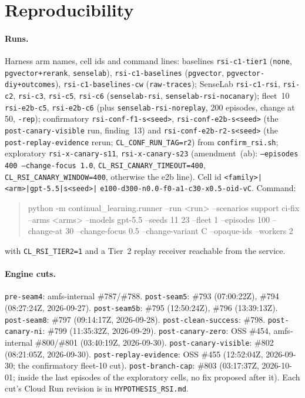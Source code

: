 \documentclass[11pt]{article}
\newcommand{\code}[1]{\texttt{#1}}
\begin{document}
\appendix
\section{Reproducibility}

\paragraph{Runs.} Harness arm names, cell ids and command lines: baselines
\code{rsi-c1-tier1} (\code{none}, \code{pgvector+rerank}, \code{senselab}),
\code{rsi-c1-baselines} (\code{pgvector}, \code{pgvector-diy+outcomes}),
\code{rsi-c1-baselines-cw} (\code{raw-traces}); SenseLab \code{rsi-c1-rsi}, \code{rsi-c2},
\code{rsi-c3}, \code{rsi-c5}, \code{rsi-c6} (\code{senselab-rsi},
\code{senselab-rsi-nocanary}); fleet~10 \code{rsi-e2b-c5}, \code{rsi-e2b-c6} (plus
\code{senselab-rsi-noreplay}, 200 episodes, change at 50, \code{-rep}); confirmatory
\code{rsi-conf-f1-s<seed>}, \code{rsi-conf-e2b-s<seed>} (the \code{post-canary-visible} run,
finding~13) and \code{rsi-conf-e2b-r2-s<seed>} (the \code{post-replay-evidence} rerun;
\code{CL\_CONF\_RUN\_TAG=r2}) from \code{confirm\_rsi.sh}; exploratory \code{rsi-x-canary-s11},
\code{rsi-x-canary-s23} (amendment~(ab): \code{--episodes 400 --change-focus 1.0},
\code{CL\_RSI\_CANARY\_TIMEOUT=400}, \code{CL\_RSI\_CANARY\_WINDOW=400}, otherwise the e2b
line). Cell id \code{<family>|<arm>|gpt-5.5|s<seed>|} \code{e100-d300-n0.0-f0-a1-c30-x0.5-oid-vC}.
Command:
\begin{quote}\scriptsize\ttfamily\raggedright python -m continual\_learning.runner --run <run> --scenarios support ci-fix --arms <arms> --models gpt-5.5 --seeds 11 23 --fleet 1 --episodes 100 --change-at 30 --change-focus 0.5 --change-variant C --opaque-ids --workers 2\end{quote}
with \code{CL\_RSI\_TIER2=1} and a Tier~2 replay receiver reachable from the service.

\paragraph{Engine cuts.} \code{pre-seam4}: amfs-internal \#787/\#788. \code{post-seam5}: \#793
(07:00:22Z), \#794 (08:27:24Z, 2026-09-27). \code{post-seam5b}: \#795 (12:50:24Z), \#796
(13:39:13Z). \code{post-seam8}: \#797 (09:14:17Z, 2026-09-28). \code{post-clean-success}:
\#798. \code{post-canary-ni}: \#799 (11:35:32Z, 2026-09-29). \code{post-canary-zero}: OSS
\#454, amfs-internal \#800/\#801 (03:40:19Z, 2026-09-30). \code{post-canary-visible}: \#802
(08:21:05Z, 2026-09-30). \code{post-replay-evidence}: OSS \#455 (12:52:04Z, 2026-09-30; the
confirmatory fleet-10 cut). \code{post-branch-cap}: \#803 (03:17:37Z, 2026-10-01; inside the
last episodes of the exploratory cells, no fix proposed after it). Each cut's Cloud Run revision
is in \code{HYPOTHESIS\_RSI.md}.
\end{document}
